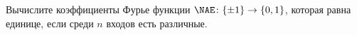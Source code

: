 Вычислите коэффициенты Фурье функции $\NAE\colon \{\pm 1\} \to \{0, 1\}$, которая равна единице, если
среди $n$ входов есть различные.